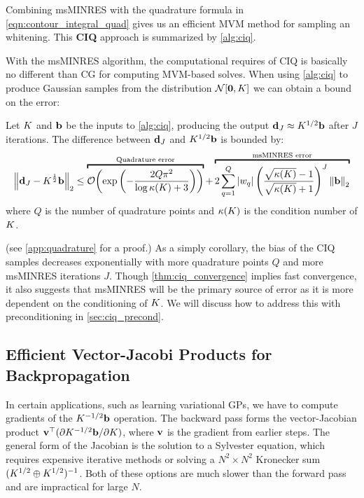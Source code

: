 Combining msMINRES with the quadrature formula in \cref{eqn:contour_integral_quad} gives us an efficient MVM method for sampling an whitening.
This {\bf CIQ} approach is summarized by \cref{alg:ciq}.

With the msMINRES algorithm, the computational requires of CIQ is basically no different than CG for computing MVM-based solves.
When using \cref{alg:ciq} to produce Gaussian samples from the distribution $\normaldist{\bzero}{\bK}$ we can obtain a bound on the error:
%
\begin{theorem}
  Let $K$ and $\mathbf{b}$ be the inputs to \cref{alg:ciq}, producing the output $\mathbf{d}_J \approx K^{1/2} \mathbf{b}$ after $J$ iterations.
  The difference between $\mathbf{d}_J$ and $K^{1/2} \mathbf{b}$ is bounded by:
  \begin{equation}
    \left\Vert \bd_J - \bK^{\frac 1 2} \bb \right\Vert_2
    \leq
    \overbracket{
      \bigo{\exp\left( -\frac{2 Q \pi^2}{\log \kappa(\bK) + 3} \right)}
    }^{\text{Quadrature error}}
    +
    \overbracket{
      2 \sum_{q=1}^Q \left\vert w_q \right\vert
      \left( \frac{ \sqrt{\kappa(\bK)} - 1}{ \sqrt{\kappa(\bK)} + 1} \right)^J
      \left\Vert \bb \right\Vert_2
    }^{\text{msMINRES error}}
  \end{equation}
  where $Q$ is the number of quadrature points and $\kappa(K)$ is the condition number of $K$.
  \label{thm:ciq_convergence}
\end{theorem}
%
(see \cref{app:quadrature} for a proof.)
As a simply corollary, the bias of the CIQ samples decreases exponentially with more quadrature points $Q$ and more msMINRES iterations $J$.
Though \cref{thm:ciq_convergence} implies fast convergence, it also suggests that msMINRES will be the primary source of error as it is more dependent on the conditioning of $K$.
We will discuss how to address this with preconditioning in \cref{sec:ciq_precond}.




\subsection{Efficient Vector-Jacobi Products for Backpropagation}

In certain applications, such as learning variational GPs, we have to compute gradients of the $K^{-1/2} \mathbf{b}$ operation.
The backward pass forms the vector-Jacobian product $\mathbf{v}^\top ( \partial K^{-1/2} \mathbf{b} / \partial K)$, where $\mathbf{v}$ is the gradient from earlier steps.
The general form of the Jacobian is the solution to a Sylvester equation, which requires expensive iterative methods or solving a $N^2 \times N^2$ Kronecker sum $(K^{1/2} \oplus K^{1/2})^{-1}$.
Both of these options are much slower than the forward pass and are impractical for large $N$.

